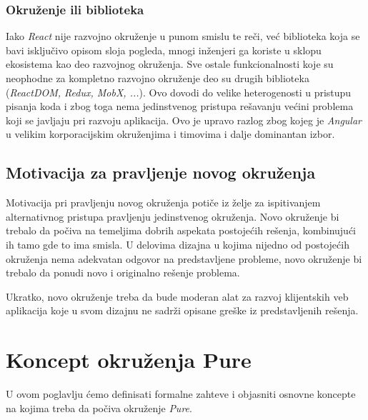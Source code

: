 \documentclass[12pt,oneside]{memoir}
\begin{document}
\subsection{Okruženje ili biblioteka}
Iako \emph{React} nije razvojno okruženje u punom smislu te reči, već biblioteka koja se bavi isključivo opisom sloja pogleda,
mnogi inženjeri ga koriste u sklopu ekosistema kao deo razvojnog okruženja.
Sve ostale funkcionalnosti koje su neophodne za kompletno razvojno okruženje deo su drugih biblioteka (\emph{ReactDOM, Redux, MobX, ...}).
Ovo dovodi do velike heterogenosti u pristupu pisanja koda i zbog toga nema jedinstvenog pristupa rešavanju većini problema
koji se javljaju pri razvoju aplikacija. Ovo je upravo razlog zbog kojeg je \emph{Angular} u velikim korporacijskim okruženjima i timovima
i dalje dominantan izbor.

\section{Motivacija za pravljenje novog okruženja}
Motivacija pri pravljenju novog okruženja potiče iz želje za ispitivanjem
alternativnog pristupa pravljenju jedinstvenog okruženja. Novo okruženje bi trebalo
da počiva na temeljima dobrih aspekata postojećih rešenja, kombinujući ih tamo
gde to ima smisla. U delovima dizajna u kojima nijedno od postojećih okruženja
nema adekvatan odgovor na predstavljene probleme, novo okruženje bi trebalo
da ponudi novo i originalno rešenje problema.

Ukratko, novo okruženje treba da bude moderan alat za razvoj klijentskih
veb aplikacija koje u svom dizajnu ne sadrži opisane greške iz predstavljenih rešenja.

\chapter{Koncept okruženja Pure}\label{chap:koncept}
U ovom poglavlju ćemo definisati formalne zahteve i objasniti osnovne koncepte na kojima treba da počiva
okruženje \emph{Pure}.
\end{document}
